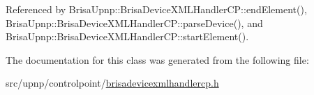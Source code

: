 Referenced by BrisaUpnp::BrisaDeviceXMLHandlerCP::endElement(), BrisaUpnp::BrisaDeviceXMLHandlerCP::parseDevice(), and BrisaUpnp::BrisaDeviceXMLHandlerCP::startElement().

The documentation for this class was generated from the following file:\begin{DoxyCompactItemize}
\item 
src/upnp/controlpoint/\hyperlink{brisadevicexmlhandlercp_8h}{brisadevicexmlhandlercp.h}\end{DoxyCompactItemize}
